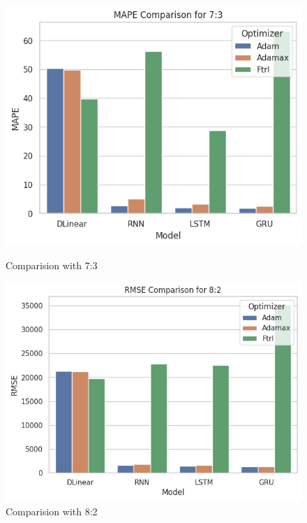 \documentclass{ieeeojies}
\begin{document}
\begin{figure}[H]
    \centering
    \begin{minipage}{0.15\textwidth}
    \centering
    \includegraphics[width=1\textwidth]{image/MAPE_73_btc.png}
    \caption{Comparision with 7:3}
    \end{minipage}
    \hfill
    \begin{minipage}{0.15\textwidth}
    \centering
    \includegraphics[width=1\textwidth]{image/MAPE_82_btc.png}
    \caption{Comparision with 8:2}
    \end{minipage}
    \hfill
    \begin{minipage}{0.15\textwidth}
    \centering

\end{minipage}
\end{figure}
\end{document}
